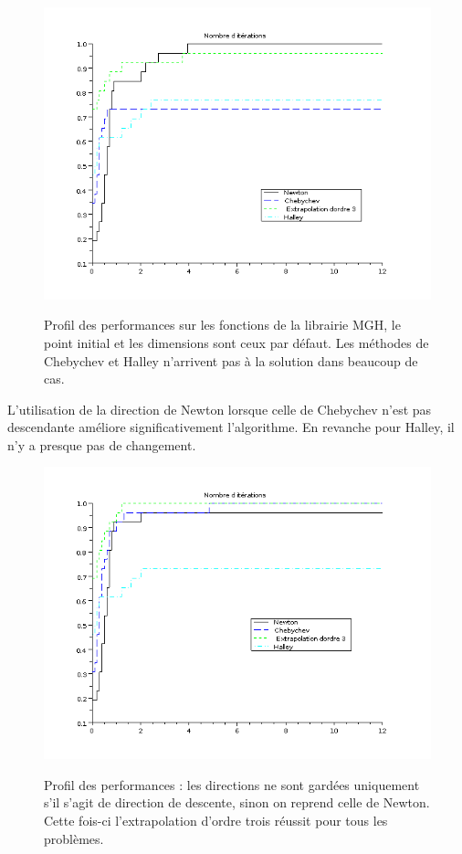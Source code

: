 \begin{figure}
\caption{Profil des performances sur les fonctions de la librairie MGH, le point initial et les dimensions sont 
ceux par d\'efaut. Les m\'ethodes de Chebychev et Halley n'arrivent pas \`a la solution dans beaucoup de cas.}\center
\includegraphics[scale=0.6]{figures/vraiesdirections.png}
\label{fig:vraies}
\end{figure}


L'utilisation de la direction de Newton lorsque celle de Chebychev n'est pas descendante am\'eliore significativement
l'algorithme. En revanche pour Halley, il n'y a presque pas de changement.
\begin{figure}
\caption{Profil des performances : les directions ne sont gard\'ees uniquement s'il s'agit de direction de descente, sinon on 
reprend celle de Newton. Cette fois-ci l'extrapolation d'ordre trois r\'eussit pour tous les probl\`emes.
}\center
\includegraphics[scale=0.6]{figures/newtonquandpasdescendante.png}
\label{fig:dirnewton}
\end{figure}





